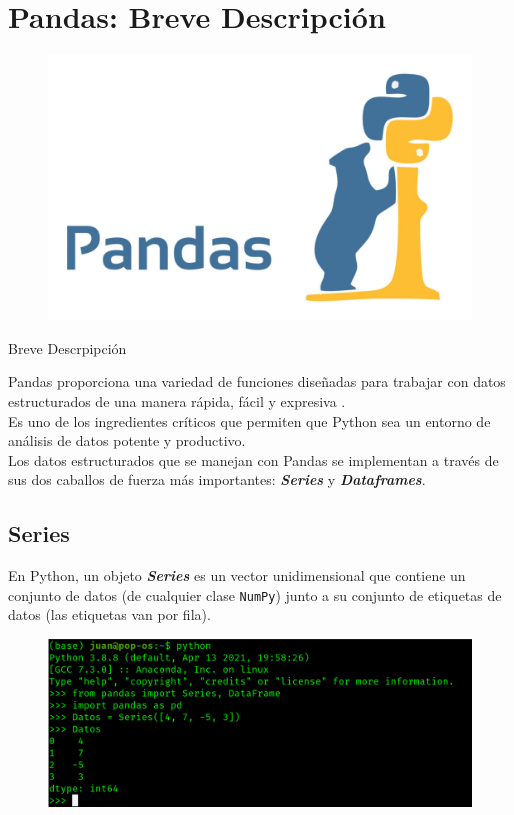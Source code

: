 \documentclass[aspectratio=169]{beamer}
\begin{document}
\section{Pandas: Breve Descripción}
\begin{frame}
\centering
\begin{figure}
\centering
\includegraphics[width=.6\textwidth]{pandas.jpg}
\end{figure}
\Huge
Breve Descrpipción
\end{frame}

\begin{frame}
Pandas proporciona una variedad de funciones diseñadas para trabajar con datos estructurados de una manera rápida, fácil y expresiva \cite{McKinney2012}. \\
\vspace{0.4cm}
Es uno de los ingredientes críticos que permiten que Python sea un entorno de análisis de datos potente y productivo.\\
\vspace{0.4cm}
Los datos estructurados que se manejan con Pandas se implementan a través de sus dos caballos de fuerza más importantes: \textbf{\textit{Series}} y \textbf{\textit{Dataframes}}.
\end{frame}

\subsection{Series}
\begin{frame}
En Python, un objeto \textbf{\textit{Series}} es un vector unidimensional que contiene un conjunto de datos (de cualquier clase \texttt{NumPy}) junto a su conjunto de etiquetas de datos (las etiquetas van por fila).
\begin{figure}
\centering
\includegraphics[width=.8\textwidth]{p1.png}
\end{figure}
\end{frame}
\end{document}
